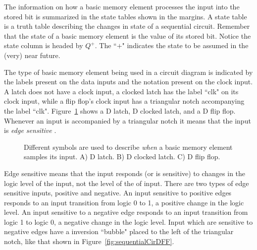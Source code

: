 The information on how a basic memory element processes the input into
the stored bit is summarized in the state tables shown in the margins.
A state table is a truth table describing the changes in state
of a sequential  circuit.  Remember that the state of a basic memory
element is the value of its stored bit.  Notice the state column
is headed by $Q^+$. The ``$+$" indicates the state to be assumed
in the (very) near future.

The type of basic memory element being used in a
circuit diagram is indicated by the labels present on the data inputs and the
notation present on the clock input.  A latch does not have a clock
input, a clocked latch has the label ``clk" on its clock input,
while a flip flop's clock input has a triangular notch accompanying
the label ``clk".  Figure~\ref{fig:sequentialCirdevices} shows a D latch,
D clocked latch, and a D flip flop.  Whenever an input is accompanied
by a triangular notch it means that the input is \textit{ edge sensitive}
.

\begin{figure}[ht]
    \caption{Different symbols are used to describe \textit{ when} a basic
memory element samples its input.  A) D latch. B) D clocked latch.
C) D flip flop.}
\label{fig:sequentialCirdevices}
\end{figure}

Edge sensitive means that the input responds (or is sensitive)
to changes in the logic level of the input, not the level of the
of input.  There are two types of edge sensitive inputs, positive
and negative.  An input sensitive to positive edges responds to an
input  transition from logic 0 to 1, a positive change in the logic
level.  An input sensitive to a negative edge responds to an input
transition from logic 1 to logic 0, a negative change in the logic
level.  Input which are sensitive to negative edges have a inversion
``bubble" placed to the left of the triangular notch, like that shown
in Figure~\ref{fig:sequentialCirDFF}.

